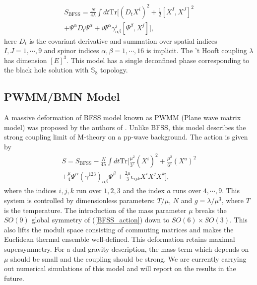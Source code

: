 \begin{align}
S_{\text{BFSS}} = \frac{N}{4\lambda} \int dt \mathrm{Tr} \Bigg[
  (D_t X^i)^2  + \frac{1}{2} \left[X^I,X^J\right]^2 \nonumber \\  +  \Psi^\alpha D_t \Psi^\alpha  
 + i \Psi^\alpha \gamma_{\alpha \beta}^j [\Psi^\beta,X^j] \Bigg],
\label{BFSS_action}
\end{align}
here $D_t$ is the covariant derivative and summation over spatial indices 
$I,J=1,\cdots,9$ and  spinor indices $\alpha,\beta=1,\cdots,16$ is implicit. 
The 't Hooft coupling $\lambda$ has dimension $[E]^3$. 
This model has a single deconfined phase corresponding to the black hole solution with $\mathbb{S}_{8}$ topology. 


\subsection{PWMM/BMN Model}
A massive deformation of BFSS model known as 
PWMM (Plane wave matrix model) was proposed by the authors of \cite{Berenstein:2002jq}. 
Unlike BFSS, this model describes the strong coupling limit of M-theory on a pp-wave background. 
The action is given by
\begin{align}
S=S_{\text{BFSS}}-\frac{N}{4\lambda} \int dt \mathrm{Tr} \Bigg[
\frac{\mu^2}{ 3^2} ( X^i)^2 + \frac{\mu^2}{ 6^2} (X^a)^2 \nonumber \\ + \frac{\mu}{4}\Psi^\alpha \left(\gamma^{123}\right)_{\alpha \beta} \Psi^\beta 
+\frac{2\mu}{3} \epsilon_{ijk} X^iX^jX^k \Bigg] ,
\label{PWMM_action}
\end{align}
where the indices $i,j,k$ run over $1,2,3$ and the index $a$ runs over $4,\cdots,9$.
This system is controlled by dimensionless parameters: $T/\mu$, $N$ and $ g=\lambda/\mu^3$, where $T$ is the temperature.
The introduction of the mass parameter $\mu$ breaks the $SO(9)$ global symmetry of (\ref{BFSS_action}) down to $SO(6)\times SO(3)$. 
This also lifts the moduli space consisting of commuting matrices and makes the Euclidean thermal ensemble well-defined. 
This deformation retains maximal supersymmetry. For a dual gravity description, the mass term which depends on $\mu$ should be small
and the coupling should be strong. We are currently carrying out numerical simulations of this model and will report on the results in the future. 



